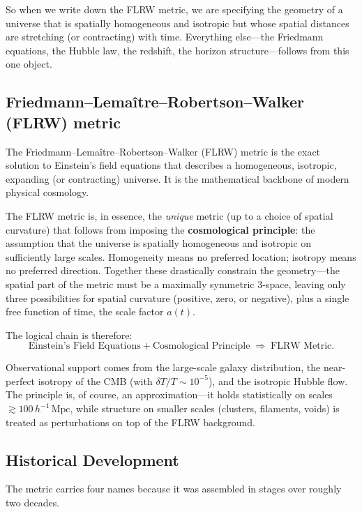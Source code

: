 So when we write down the FLRW metric, we are specifying the geometry of a universe that is spatially homogeneous and isotropic but whose spatial distances are stretching (or contracting) with time. Everything else---the Friedmann equations, the Hubble law, the redshift, the horizon structure---follows from this one object.


\subsection{Friedmann--Lema\^{i}tre--Robertson--Walker (FLRW) metric }
The Friedmann--Lema\^{i}tre--Robertson--Walker (FLRW) metric is the exact solution to Einstein's field equations that describes a homogeneous, isotropic, expanding (or contracting) universe. It is the mathematical backbone of modern physical cosmology.

The FLRW metric is, in essence, the \emph{unique} metric (up to a choice of spatial curvature) that follows from imposing the \textbf{cosmological principle}: the assumption that the universe is spatially homogeneous and isotropic on sufficiently large scales. Homogeneity means no preferred location; isotropy means no preferred direction. Together these drastically constrain the geometry---the spatial part of the metric must be a maximally symmetric 3-space, leaving only three possibilities for spatial curvature (positive, zero, or negative), plus a single free function of time, the scale factor $a(t)$.

The logical chain is therefore:
\begin{equation*}
    \text{Einstein's Field Equations} + \text{Cosmological Principle} \;\Longrightarrow\; \text{FLRW Metric.}
\end{equation*}

Observational support comes from the large-scale galaxy distribution, the near-perfect isotropy of the CMB (with $\delta T/T \sim 10^{-5}$), and the isotropic Hubble flow. The principle is, of course, an approximation---it holds statistically on scales $\gtrsim 100\,h^{-1}\,\mathrm{Mpc}$, while structure on smaller scales (clusters, filaments, voids) is treated as perturbations on top of the FLRW background.

\subsection{Historical Development}

The metric carries four names because it was assembled in stages over roughly two decades.

